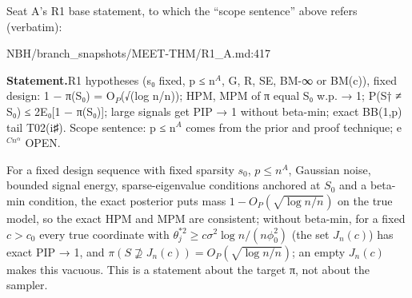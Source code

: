 Seat A's R1 base statement, to which the ``scope sentence'' above refers (verbatim):
\begin{stmt}{NBH/branch_snapshots/MEET-THM/R1_A.md:417}
\par\smallskip\noindent\textbf{Statement.}\enspace R1 hypotheses (s₀ fixed, p ≤ n$^{A}$, G, R, SE, BM-∞ or BM(c)), fixed design: 1 − π(S₀) = O$_{P}$(√(log n/n)); HPM, MPM of π equal S₀ w.p. → 1; P(S† ≠ S₀) ≤ 2E₀[1 − π(S₀)]; large signals get PIP → 1 without beta-min; exact BB(1,p) tail T02(i♯). Scope sentence: p ≤ n$^{A}$ comes from the prior and proof technique; e$^{Cn^{α}}$ OPEN.
\end{stmt}

\begin{plain}
For a fixed design sequence with fixed sparsity $s_0$, $p\le n^A$, Gaussian noise, bounded signal energy, sparse-eigenvalue conditions anchored at $S_0$ and a beta-min condition, the exact posterior puts mass $1-O_P(\sqrt{\log n/n})$ on the true model, so the exact HPM and MPM are consistent; without beta-min, for a fixed $c>c_0$ every true coordinate with $\theta_j^{*2}\ge c\sigma^2\log n/(n\phi_0^2)$ (the set $J_n(c)$) has exact PIP → 1, and $\pi(S\not\supseteq J_n(c))=O_P(\sqrt{\log n/n})$; an empty $J_n(c)$ makes this vacuous. This is a statement about the target π, not about the sampler.
\end{plain}
